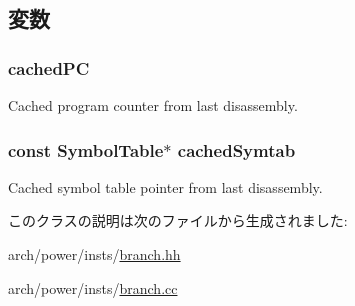 \subsection{変数}
\hypertarget{classPowerISA_1_1PCDependentDisassembly_a92e75fec0c774a50b26a771e76837a1d}{
\subsubsection[{cachedPC}]{ {\bf cachedPC}}}
\label{classPowerISA_1_1PCDependentDisassembly_a92e75fec0c774a50b26a771e76837a1d}


Cached program counter from last disassembly. \hypertarget{classPowerISA_1_1PCDependentDisassembly_a1caab72ff070063c1be05a93a7014546}{
\subsubsection[{cachedSymtab}]{\setlength{\rightskip}{0pt plus 5cm}const {\bf SymbolTable}$\ast$ {\bf cachedSymtab}}}
\label{classPowerISA_1_1PCDependentDisassembly_a1caab72ff070063c1be05a93a7014546}


Cached symbol table pointer from last disassembly. 

このクラスの説明は次のファイルから生成されました:\begin{DoxyCompactItemize}
\item 
arch/power/insts/\hyperlink{power_2insts_2branch_8hh}{branch.hh}\item 
arch/power/insts/\hyperlink{branch_8cc}{branch.cc}\end{DoxyCompactItemize}
